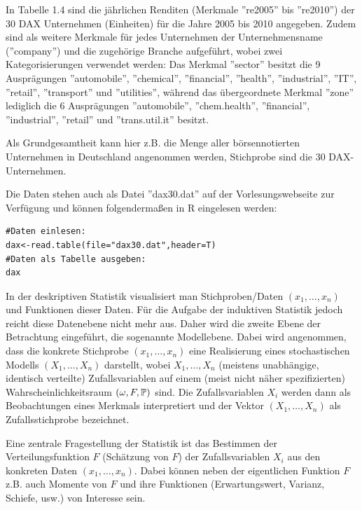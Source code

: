 \begin{exmp}[DAX30]
  In Tabelle 1.4 sind die jährlichen Renditen (Merkmale ”re2005” bis ”re2010”)
  der 30 DAX Unternehmen (Einheiten) für die Jahre 2005 bis 2010 angegeben.
  Zudem sind als weitere Merkmale für jedes Unternehmen der Unternehmensname
  (”company”) und die zugehörige Branche aufgeführt, wobei zwei
  Kategorisierungen verwendet werden: Das Merkmal ”sector” besitzt die 9
  Ausprägungen ”automobile”, ”chemical”, ”financial”, ”health”, ”industrial”,
  ”IT”, ”retail”, ”transport” und ”utilities”, während das übergeordnete Merkmal
  ”zone” lediglich die 6 Ausprägungen ”automobile”, ”chem.health”, ”financial”,
  ”industrial”, ”retail” und ”trans.util.it” besitzt.
  
  Als Grundgesamtheit kann hier z.B. die Menge aller börsennotierten Unternehmen
  in Deutschland angenommen werden, Stichprobe sind die 30 DAX-Unternehmen.
  
  Die Daten stehen auch als Datei ”dax30.dat” auf der Vorlesungswebseite zur
  Verfügung und können folgendermaßen in R eingelesen werden:
  \begin{verbatim}
#Daten einlesen:
dax<-read.table(file="dax30.dat",header=T)
#Daten als Tabelle ausgeben:
dax
  \end{verbatim}
\end{exmp}

In der deskriptiven Statistik visualisiert man Stichproben/Daten $(x_1, \ldots,
x_n)$ und Funktionen dieser Daten. Für die Aufgabe der induktiven Statistik
jedoch reicht diese Datenebene nicht mehr aus. Daher wird die zweite Ebene der
Betrachtung eingeführt, die sogenannte Modellebene. Dabei wird angenommen,
dass die konkrete Stichprobe $(x_1, \ldots, x_n)$ eine Realisierung eines
stochastischen Modells $(X_1, \ldots, X_n)$ darstellt, wobei $X_1, \ldots,
X_n$ (meistens unabhängige, identisch verteilte) Zufallsvariablen auf einem
(meist nicht näher spezifizierten) Wahrscheinlichkeitsraum $(\omega, F, \mathbb{P})$
sind. Die Zufallsvariablen $X_i$ werden dann als Beobachtungen eines Merkmals
interpretiert und der Vektor $(X_1, \ldots, X_n)$ als Zufallsstichprobe
bezeichnet.
  
Eine zentrale Fragestellung der Statistik ist das Bestimmen der
Verteilungsfunktion $F$ (Schätzung von $F$) der Zufallsvariablen $X_i$ aus den
konkreten Daten $(x_1, \ldots, x_n)$. Dabei können neben der eigentlichen
Funktion $F$ z.B. auch Momente von $F$ und ihre Funktionen (Erwartungswert,
Varianz, Schiefe, usw.) von Interesse sein.

